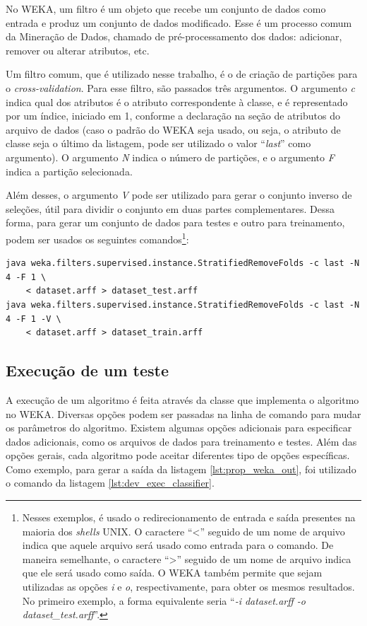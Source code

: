 No WEKA, um filtro é um objeto que recebe um conjunto de dados como entrada e produz um conjunto de dados modificado. Esse é um processo comum da Mineração de Dados, chamado de pré-processamento dos dados: adicionar, remover ou alterar atributos, etc.

Um filtro comum, que é utilizado nesse trabalho, é o de criação de partições para o \emph{cross-validation}. Para esse filtro, são passados três argumentos. O argumento \emph{c} indica qual dos atributos é o atributo correspondente à classe, e é representado por um índice, iniciado em 1, conforme a declaração na seção de atributos do arquivo de dados (caso o padrão do WEKA seja usado, ou seja, o atributo de classe seja o último da listagem, pode ser utilizado o valor ``\emph{last}'' como argumento). O argumento \emph{N} indica o número de partições, e o argumento \emph{F} indica a partição selecionada.

Além desses, o argumento \emph{V} pode ser utilizado para gerar o conjunto inverso de seleções, útil para dividir o conjunto em duas partes complementares. Dessa forma, para gerar um conjunto de dados para testes e outro para treinamento, podem ser usados os seguintes comandos\footnote{Nesses exemplos, é usado o redirecionamento de entrada e saída presentes na maioria dos \emph{shells} UNIX. O caractere ``<'' seguido de um nome de arquivo indica que aquele arquivo será usado como entrada para o comando. De maneira semelhante, o caractere ``>'' seguido de um nome de arquivo indica que ele será usado como saída. O WEKA também permite que sejam utilizadas as opções \emph{i} e \emph{o}, respectivamente, para obter os mesmos resultados. No primeiro exemplo, a forma equivalente seria ``\emph{-i dataset.arff -o dataset\_test.arff}''.}:

\begin{lstlisting}[caption=Filtro para geração de partições para \emph{cross-validation}, label=lst:dev_filter]
java weka.filters.supervised.instance.StratifiedRemoveFolds -c last -N 4 -F 1 \
    < dataset.arff > dataset_test.arff
java weka.filters.supervised.instance.StratifiedRemoveFolds -c last -N 4 -F 1 -V \
    < dataset.arff > dataset_train.arff
\end{lstlisting}

\subsection{Execução de um teste}

A execução de um algoritmo é feita através da classe que implementa o algoritmo no WEKA. Diversas opções podem ser passadas na linha de comando para mudar os parâmetros do algoritmo. Existem algumas opções adicionais para especificar dados adicionais, como os arquivos de dados para treinamento e testes. Além das opções gerais, cada algoritmo pode aceitar diferentes tipo de opções específicas. Como exemplo, para gerar a saída da listagem \ref{lst:prop_weka_out}, foi utilizado o comando da listagem \ref{lst:dev_exec_classifier}.

